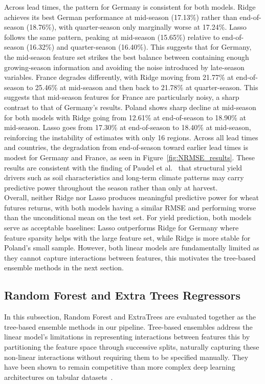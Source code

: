 \documentclass[pdflatex,sn-mathphys-num, oneside, 11pt]{sn-jnl}%
\theoremstyle{thmstyleone}%
\theoremstyle{thmstyletwo}%
\theoremstyle{thmstylethree}%
\begin{document}
Across lead times, the pattern for Germany is consistent for both models. Ridge achieves its best German performance at mid-season (17.13\%) rather than end-of-season (18.76\%), with quarter-season only marginally worse at 17.24\%. Lasso follows the same pattern, peaking at mid-season (15.65\%) relative to end-of-season (16.32\%) and quarter-season (16.40\%). This suggests that for Germany, the mid-season feature set strikes the best balance between containing enough growing-season information and avoiding the noise introduced by late-season variables. France degrades differently, with Ridge moving from 21.77\% at end-of-season to 25.46\% at mid-season and then back to 21.78\% at quarter-season. This suggests that mid-season features for France are particularly noisy, a sharp contrast to that of Germany's results. Poland shows sharp decline at mid-season for both models with Ridge going from 12.61\% at end-of-season to 18.90\% at mid-season. Lasso goes from 17.30\% at end-of-season to 18.40\% at mid-season, reinforcing the instability of estimates with only 16 regions. Across all lead times and countries, the degradation from end-of-season toward earlier lead times is modest for Germany and France, as seen in Figure~\ref{fig:NRMSE_results}. These results are consistent with the finding of Paudel et al.~\cite{bib16} that structural yield drivers such as soil characteristics and long-term climate patterns may carry predictive power throughout the season rather than only at harvest.\\

Overall, neither Ridge nor Lasso produces meaningful predictive power for wheat futures returns, with both models having a similar RMSE and performing worse than the unconditional mean on the test set. For yield prediction, both models serve as acceptable baselines: Lasso outperforms Ridge for Germany where feature sparsity helps with the large feature set, while Ridge is more stable for Poland's small sample. However, both linear models are fundamentally limited as they cannot capture interactions between features, this motivates the tree-based ensemble methods in the next section.

\subsection{Random Forest and Extra Trees Regressors}\label{sec:rf_et}

In this subsection, Random Forest and ExtraTrees are evaluated together as the tree-based ensemble methods in our pipeline. Tree-based ensembles address the linear model's limitations in representing interactions between features this by partitioning the feature space through successive splits, naturally capturing these non-linear interactions without requiring them to be specified manually. They have been shown to remain competitive than more complex deep learning architectures on tabular datasets~\cite{bib27}.\\
\end{document}
